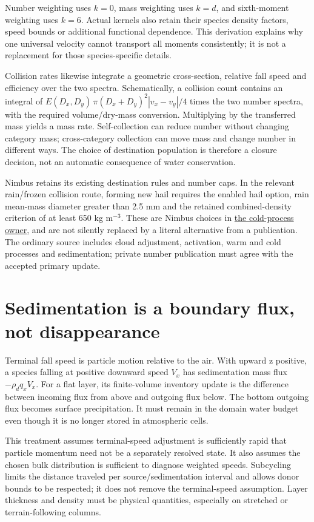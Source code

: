 \documentclass[
  11pt,
]{report}
\begin{document}
Number weighting uses \(k=0\), mass weighting uses \(k=d\), and
sixth-moment weighting uses \(k=6\). Actual kernels also retain their
species density factors, speed bounds or additional functional
dependence. This derivation explains why one universal velocity cannot
transport all moments consistently; it is not a replacement for those
species-specific details.

Collision rates likewise integrate a geometric cross-section, relative
fall speed and efficiency over the two spectra. Schematically, a
collision count contains an integral of
\(E(D_x,D_y)\,\pi(D_x+D_y)^2|v_x-v_y|/4\) times the two number spectra,
with the required volume/dry-mass conversion. Multiplying by the
transferred mass yields a mass rate. Self-collection can reduce number
without changing category mass; cross-category collection can move mass
and change number in different ways. The choice of destination
population is therefore a closure decision, not an automatic consequence
of water conservation.

Nimbus retains its existing destination rules and number caps. In the
relevant rain/frozen collision route, forming new hail requires the
enabled hail option, rain mean-mass diameter greater than 2.5 mm and the
retained combined-density criterion of at least 650 kg m\(^{-3}\). These
are Nimbus choices in
\href{../src/microphysics/schemes/milbrandt/cold.hpp}{the cold-process
owner}, and are not silently replaced by a literal alternative from a
publication. The ordinary source includes cloud adjustment, activation,
warm and cold processes and sedimentation; private number publication
must agree with the accepted primary update.

\section{Sedimentation is a boundary flux, not
disappearance}\label{sedimentation-is-a-boundary-flux-not-disappearance}

Terminal fall speed is particle motion relative to the air. With upward
z positive, a species falling at positive downward speed \(V_x\) has
sedimentation mass flux \(-\rho_d q_xV_x\). For a flat layer, its
finite-volume inventory update is the difference between incoming flux
from above and outgoing flux below. The bottom outgoing flux becomes
surface precipitation. It must remain in the domain water budget even
though it is no longer stored in atmospheric cells.

This treatment assumes terminal-speed adjustment is sufficiently rapid
that particle momentum need not be a separately resolved state. It also
assumes the chosen bulk distribution is sufficient to diagnose weighted
speeds. Subcycling limits the distance traveled per source/sedimentation
interval and allows donor bounds to be respected; it does not remove the
terminal-speed assumption. Layer thickness and density must be physical
quantities, especially on stretched or terrain-following columns.
\end{document}
